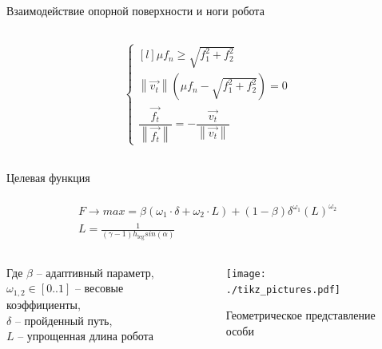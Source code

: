 \begin{frame}[t]{Взаимодействие опорной поверхности и ноги робота}
\begin{columns}[T,onlytextwidth]
\begin{column}{0.35\textwidth}
\begin{align}
                \left\{\begin{matrix*}[l]
                           \mu f_n \geqslant \sqrt{f_1^2 + f_2^2}\\
                           \left\lVert \vec{v_t}\right\rVert (\mu f_n - \sqrt{f_1^2 + f_2^2}) = 0\\
                           \dfrac{\vec{f_t}}{\left\lVert \vec{f_t}\right\rVert } = - \dfrac{\vec{v_t}}{\left\lVert \vec{v_t}\right\rVert }
                       \end{matrix*}\right.
            \end{align}
        \end{column}
    \end{columns}
\end{frame}


\begin{frame}[t]{Целевая функция}
    \framesubtitle{}
    \begin{eqnarray}
        F \rightarrow max = \beta \left( {\omega}_{1} \cdot \delta + {\omega}_{2} \cdot L\right) + (1 - \beta) {\delta}^{{\omega}_{1}} {\left( L\right)}^{{\omega}_{2}} \\
        L = \frac{1}{(\gamma - 1) h_{\text{leg}}sin(\alpha)}
    \end{eqnarray}
    \begin{columns}[T,onlytextwidth]
        \begin{column}{0.48\textwidth}
            Где
            $\beta$ -- адаптивный параметр, \\ ${\omega}_{1,2} \in  [ 0..1 ] $ -- весовые коэффициенты, \\
            $\delta$ -- пройденный путь, \\
            $L$ -- упрощенная длина робота

        \end{column}
        \begin{column}{0.50\textwidth}
            \begin{figure}[H]
                \centering
                \centering\texttt{[image: ./tikz\_pictures.pdf]}
                \caption*{Геометрическое представление особи}
            \end{figure}
        \end{column}
    \end{columns}
\end{frame}

